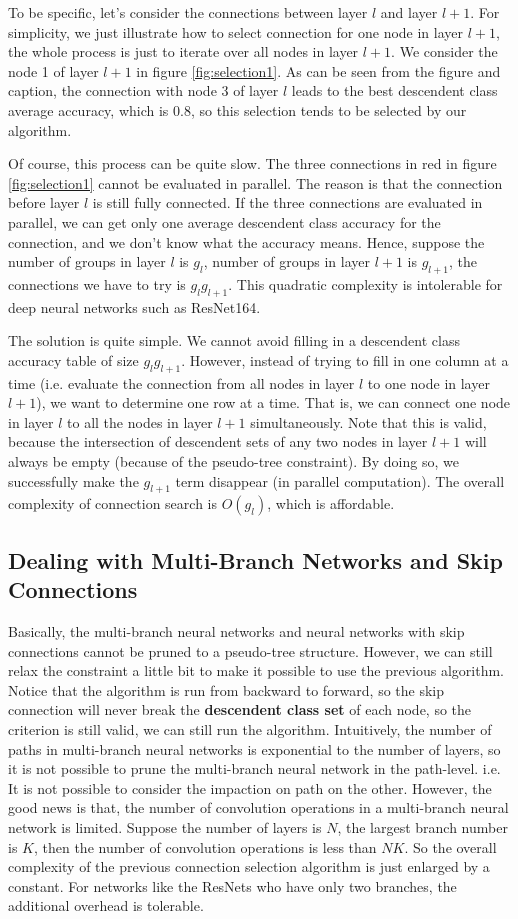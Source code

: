 \documentclass{acmtog} %
\begin{document}
To be specific, let's consider the connections between layer $l$ and layer $l+1$. For simplicity, we just illustrate how to select connection for one node in layer $l+1$, the whole process is just to iterate over all nodes in layer $l+1$. We consider the node 1 of layer $l+1$ in figure \ref{fig:selection1}. As can be seen from the figure and caption, the connection with node 3 of layer $l$ leads to the best descendent class average accuracy, which is 0.8, so this selection tends to be selected by our algorithm.

Of course, this process can be quite slow. The three connections in red in figure \ref{fig:selection1} cannot be evaluated in parallel. The reason is that the connection before layer $l$ is still fully connected. If the three connections are evaluated in parallel, we can get only one average descendent class accuracy for the connection, and we don't know what the accuracy means. Hence, suppose the number of groups in layer $l$ is $g_l$, number of groups in layer $l+1$ is $g_{l+1}$, the connections we have to try is $g_l g_{l+1}$. This quadratic complexity is intolerable for deep neural networks such as ResNet164.

The solution is quite simple. We cannot avoid filling in a descendent class accuracy table of size $g_l g_{l+1}$. However, instead of trying to fill in one column at a time (i.e. evaluate the connection from all nodes in layer $l$ to one node in layer $l+1$), we want to determine one row at a time. That is, we can connect one node in layer $l$ to all the nodes in layer $l+1$ simultaneously. Note that this is valid, because the intersection of descendent sets of any two nodes in layer $l+1$ will always be empty (because of the pseudo-tree constraint). By doing so, we successfully make the $g_{l+1}$ term disappear (in parallel computation). The overall complexity of connection search is $O(g_l)$, which is affordable.
\subsection{Dealing with Multi-Branch Networks and Skip Connections}
Basically, the multi-branch neural networks and neural networks with skip connections cannot be pruned to a pseudo-tree structure. However, we can still relax the constraint a little bit to make it possible to use the previous algorithm. Notice that the algorithm is run from backward to forward, so the skip connection will never break the \textbf{descendent class set} of each node, so the criterion is still valid, we can still run the algorithm. Intuitively, the number of paths in multi-branch neural networks is exponential to the number of layers, so it is not possible to prune the multi-branch neural network in the path-level. i.e. It is not possible to consider the impaction on path on the other. However, the good news is that, the number of convolution operations in a multi-branch neural network is limited. Suppose the number of layers is $N$, the largest branch number is $K$, then the number of convolution operations is less than $NK$. So the overall complexity of the previous connection selection algorithm is just enlarged by a constant. For networks like the ResNets who have only two branches, the additional overhead is tolerable.
\end{document}
